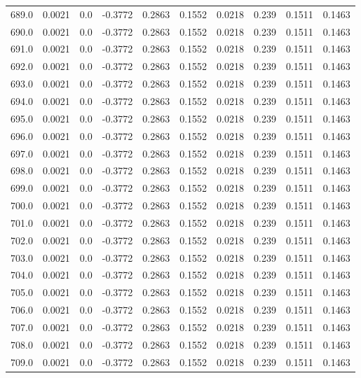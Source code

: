 \begin{longtable}{lrrrrrrrrr}
689.0 & 0.0021 & 0.0 & -0.3772 & 0.2863 & 0.1552 & 0.0218 & 0.239 & 0.1511 & 0.1463 \\
690.0 & 0.0021 & 0.0 & -0.3772 & 0.2863 & 0.1552 & 0.0218 & 0.239 & 0.1511 & 0.1463 \\
691.0 & 0.0021 & 0.0 & -0.3772 & 0.2863 & 0.1552 & 0.0218 & 0.239 & 0.1511 & 0.1463 \\
692.0 & 0.0021 & 0.0 & -0.3772 & 0.2863 & 0.1552 & 0.0218 & 0.239 & 0.1511 & 0.1463 \\
693.0 & 0.0021 & 0.0 & -0.3772 & 0.2863 & 0.1552 & 0.0218 & 0.239 & 0.1511 & 0.1463 \\
694.0 & 0.0021 & 0.0 & -0.3772 & 0.2863 & 0.1552 & 0.0218 & 0.239 & 0.1511 & 0.1463 \\
695.0 & 0.0021 & 0.0 & -0.3772 & 0.2863 & 0.1552 & 0.0218 & 0.239 & 0.1511 & 0.1463 \\
696.0 & 0.0021 & 0.0 & -0.3772 & 0.2863 & 0.1552 & 0.0218 & 0.239 & 0.1511 & 0.1463 \\
697.0 & 0.0021 & 0.0 & -0.3772 & 0.2863 & 0.1552 & 0.0218 & 0.239 & 0.1511 & 0.1463 \\
698.0 & 0.0021 & 0.0 & -0.3772 & 0.2863 & 0.1552 & 0.0218 & 0.239 & 0.1511 & 0.1463 \\
699.0 & 0.0021 & 0.0 & -0.3772 & 0.2863 & 0.1552 & 0.0218 & 0.239 & 0.1511 & 0.1463 \\
700.0 & 0.0021 & 0.0 & -0.3772 & 0.2863 & 0.1552 & 0.0218 & 0.239 & 0.1511 & 0.1463 \\
701.0 & 0.0021 & 0.0 & -0.3772 & 0.2863 & 0.1552 & 0.0218 & 0.239 & 0.1511 & 0.1463 \\
702.0 & 0.0021 & 0.0 & -0.3772 & 0.2863 & 0.1552 & 0.0218 & 0.239 & 0.1511 & 0.1463 \\
703.0 & 0.0021 & 0.0 & -0.3772 & 0.2863 & 0.1552 & 0.0218 & 0.239 & 0.1511 & 0.1463 \\
704.0 & 0.0021 & 0.0 & -0.3772 & 0.2863 & 0.1552 & 0.0218 & 0.239 & 0.1511 & 0.1463 \\
705.0 & 0.0021 & 0.0 & -0.3772 & 0.2863 & 0.1552 & 0.0218 & 0.239 & 0.1511 & 0.1463 \\
706.0 & 0.0021 & 0.0 & -0.3772 & 0.2863 & 0.1552 & 0.0218 & 0.239 & 0.1511 & 0.1463 \\
707.0 & 0.0021 & 0.0 & -0.3772 & 0.2863 & 0.1552 & 0.0218 & 0.239 & 0.1511 & 0.1463 \\
708.0 & 0.0021 & 0.0 & -0.3772 & 0.2863 & 0.1552 & 0.0218 & 0.239 & 0.1511 & 0.1463 \\
709.0 & 0.0021 & 0.0 & -0.3772 & 0.2863 & 0.1552 & 0.0218 & 0.239 & 0.1511 & 0.1463 \\

\end{longtable}
